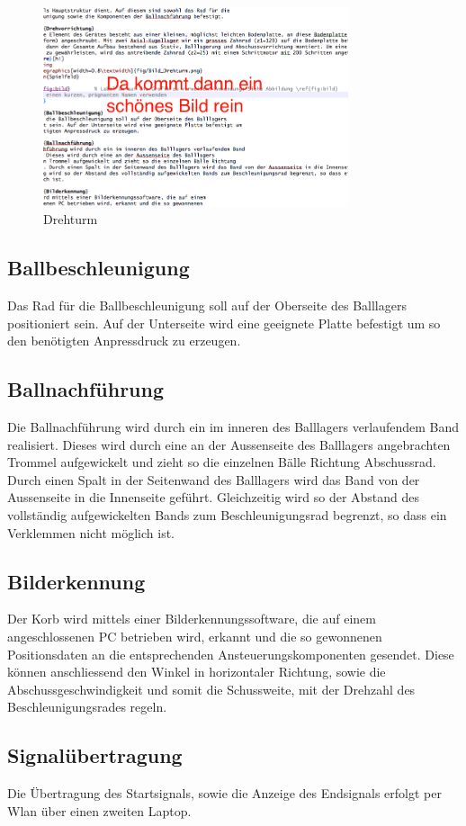 \begin{figure}[h!]          
	\centering             
	\includegraphics[width=0.8\textwidth]{fig/Bild_Drehturm.png}    
	\caption{Drehturm}
	
	\label{fig:bild}        %
\end{figure}

\subsection{Ballbeschleunigung}
Das Rad für die Ballbeschleunigung soll auf der Oberseite des Balllagers 
positioniert sein. Auf der Unterseite wird eine geeignete Platte befestigt um 
so den benötigten Anpressdruck zu erzeugen. 

\subsection{Ballnachführung}
Die Ballnachführung wird durch ein im inneren des Balllagers verlaufendem Band 
realisiert. Dieses wird durch eine an der Aussenseite des Balllagers 
angebrachten Trommel aufgewickelt und zieht so die einzelnen Bälle Richtung 
Abschussrad. Durch einen Spalt in der Seitenwand des Balllagers wird das Band von der Aussenseite in die Innenseite geführt. Gleichzeitig wird so der Abstand des vollständig aufgewickelten Bands zum Beschleunigungsrad begrenzt, so dass ein Verklemmen nicht möglich ist.

\subsection{Bilderkennung}
Der Korb wird mittels einer Bilderkennungssoftware, die auf einem 
angeschlossenen PC betrieben wird, erkannt und die so gewonnenen 
Positionsdaten an die entsprechenden Ansteuerungskomponenten gesendet. Diese 
können anschliessend den Winkel in horizontaler Richtung, sowie die 
Abschussgeschwindigkeit und somit die Schussweite, mit der Drehzahl des 
Beschleunigungsrades regeln.

\subsection{Signalübertragung}
Die Übertragung des Startsignals, sowie die Anzeige des Endsignals erfolgt per 
Wlan über einen zweiten Laptop.
